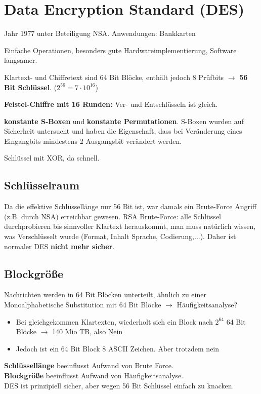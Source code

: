 \section{Data Encryption Standard (DES)}
Jahr 1977 unter Beteiligung NSA. Anwendungen: Bankkarten

Einfache Operationen, besonders gute Hardwareimplementierung, Software langsamer.

Klartext- und Chiffretext sind 64 Bit Blöcke, enthält jedoch 8 Prüfbits $\rightarrow$ \textbf{56 Bit Schlüssel}. ($2^{56} = 7 \cdot 10^{16}$)

\textbf{Feistel-Chiffre mit 16 Runden:} Ver- und Entschlüsseln ist gleich.

\textbf{konstante S-Boxen} und \textbf{konstante Permutationen}. S-Boxen wurden auf Sicherheit untersucht und haben die Eigenschaft, dass bei Veränderung eines Eingangbits mindestens 2 Ausgangsbit verändert werden.

Schlüssel mit XOR, da schnell.

\subsection{Schlüsselraum}
Da die effektive Schlüssellänge nur 56 Bit ist, war damals ein Brute-Force Angriff (z.B. durch NSA) erreichbar gewesen. RSA Brute-Force: alle Schlüssel durchprobieren bis sinnvoller Klartext herauskommt, man muss natürlich wissen, was Verschlüsselt wurde (Format, Inhalt Sprache, Codierung,...). Daher ist normaler DES \textbf{nicht mehr sicher}.

\subsection{Blockgröße}
Nachrichten werden in 64 Bit Blöcken unterteilt, ähnlich zu einer Monoalphabetische Substitution mit 64 Bit Blöcke $\rightarrow$ Häufigkeitsanalyse?
\begin{itemize}
	\item Bei gleichgekommen Klartexten, wiederholt sich ein Block nach $2^64$ 64 Bit Blöcke $\rightarrow$ 140 Mio TB, also Nein
	\item Jedoch ist ein 64 Bit Block 8 ASCII Zeichen. Aber trotzdem nein
\end{itemize}

\textbf{Schlüssellänge} beeinflusst Aufwand von Brute Force. \\
\textbf{Blockgröße} beeinflusst Aufwand von Häufigkeitsanalyse. \\
DES ist prinzipiell sicher, aber wegen 56 Bit Schlüssel einfach zu knacken.

